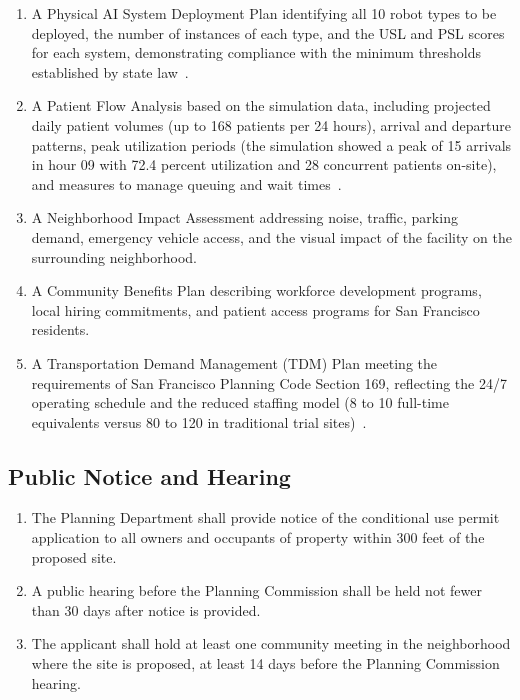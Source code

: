 \begin{enumerate}[label=(\alph*)]
\item A Physical AI System Deployment Plan identifying all 10 robot types to be
  deployed, the number of instances of each type, and the USL and PSL scores
  for each system, demonstrating compliance with the minimum thresholds
  established by state law~\cite{usl2026,pslframework2026}.

\item A Patient Flow Analysis based on the simulation data, including projected
  daily patient volumes (up to 168 patients per 24 hours), arrival and
  departure patterns, peak utilization periods (the simulation showed a peak
  of 15 arrivals in hour 09 with 72.4 percent utilization and 28 concurrent
  patients on-site), and measures to manage queuing and
  wait times~\cite{newtrial2026}.

\item A Neighborhood Impact Assessment addressing noise, traffic, parking
  demand, emergency vehicle access, and the visual impact of the facility on
  the surrounding neighborhood.

\item A Community Benefits Plan describing workforce development programs,
  local hiring commitments, and patient access programs for San Francisco
  residents.

\item A Transportation Demand Management (TDM) Plan meeting the requirements
  of San Francisco Planning Code Section 169, reflecting the 24/7 operating
  schedule and the reduced staffing model (8 to 10 full-time equivalents
  versus 80 to 120 in traditional trial sites)~\cite{sitespec2026}.
\end{enumerate}

\subsection{Public Notice and Hearing}

\begin{enumerate}[label=(\alph*)]
\item The Planning Department shall provide notice of the conditional use
  permit application to all owners and occupants of property within 300 feet
  of the proposed site.

\item A public hearing before the Planning Commission shall be held not fewer
  than 30 days after notice is provided.

\item The applicant shall hold at least one community meeting in the
  neighborhood where the site is proposed, at least 14 days before the
  Planning Commission hearing.
\end{enumerate}

